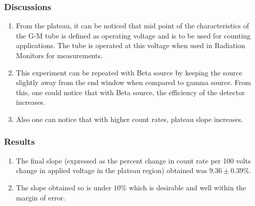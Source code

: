 \documentclass[%
 reprint,
nofootinbib,
 amsmath,amssymb,
 aps,
floatfix,
]{revtex4-2}
\begin{document}
        \subsubsection{Discussions}
        \begin{enumerate}
            \item From the plateau, it can be noticed that mid point of the characteristics of the G-M tube is defined as operating voltage and is to be used for counting applications. The tube is operated at this voltage when used in Radiation Monitors for measurements.
            \item This experiment can be repeated with Beta source by keeping the source slightly away from the end window when compared to gamma source. From this, one could notice that with Beta source, the efficiency of the detector increases.
            \item Also one can notice that with higher count rates, plateau slope increases.
        \end{enumerate}
        \subsubsection{Results}
        \begin{enumerate}
            \item The final slope (expressed as  the percent change in count rate per 100 volts change in applied voltage in the plateau region) obtained was $9.36 \pm 0.39 \%$.
            \item The slope obtained so is under $10\%$ which is desirable and well within the margin of error.
        \end{enumerate}

    
\end{document}
